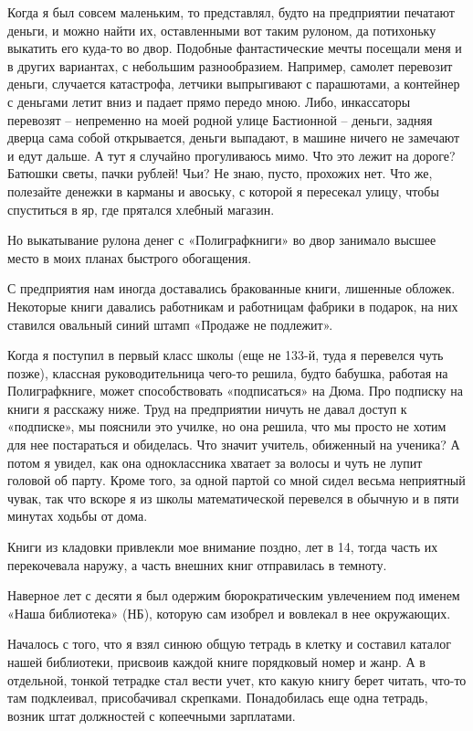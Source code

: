 Когда я был совсем маленьким, то представлял, будто на предприятии печатают деньги, и можно найти их, оставленными вот таким рулоном, да потихоньку выкатить его куда-то во двор. Подобные фантастические мечты посещали меня и в других вариантах, с небольшим разнообразием. Например, самолет перевозит деньги, случается катастрофа, летчики выпрыгивают с парашютами, а контейнер с деньгами летит вниз и падает прямо передо мною. Либо, инкассаторы перевозят – непременно на моей родной улице Бастионной – деньги, задняя дверца сама собой открывается, деньги выпадают, в машине ничего не замечают и едут дальше. А тут я случайно прогуливаюсь мимо. Что это лежит на дороге? Батюшки светы, пачки рублей! Чьи? Не знаю, пусто, прохожих нет. Что же, полезайте денежки в карманы и авоську, с которой я пересекал улицу, чтобы спуститься в яр, где прятался хлебный магазин.

Но выкатывание рулона денег с «Полиграфкниги» во двор занимало высшее место в моих планах быстрого обогащения.

С предприятия нам иногда доставались бракованные книги, лишенные обложек. Некоторые книги давались работникам и работницам фабрики в подарок, на них ставился овальный синий штамп «Продаже не подлежит».

Когда я поступил в первый класс школы (еще не 133-й, туда я перевелся чуть позже), классная руководительница чего-то решила, будто бабушка, работая на Полиграфкниге, может способствовать «подписаться» на Дюма. Про подписку на книги я расскажу ниже. Труд на предприятии ничуть не давал доступ к «подписке», мы пояснили это училке, но она решила, что мы просто не хотим для нее постараться и обиделась. Что значит учитель, обиженный на ученика? А потом я увидел, как она одноклассника хватает за волосы и чуть не лупит головой об парту. Кроме того, за одной партой со мной сидел весьма неприятный чувак, так что вскоре я из школы математической перевелся в обычную и в пяти минутах ходьбы от дома.

Книги из кладовки привлекли мое внимание поздно, лет в 14, тогда часть их перекочевала наружу, а часть внешних книг отправилась в темноту.

Наверное лет с десяти я был одержим бюрократическим увлечением под именем «Наша библиотека» (НБ), которую сам изобрел и вовлекал в нее окружающих. 

Началось с того, что я взял синюю общую тетрадь в клетку и составил каталог нашей библиотеки, присвоив каждой книге порядковый номер и жанр. А в отдельной, тонкой тетрадке стал вести учет, кто какую книгу берет читать, что-то там подклеивал, присобачивал скрепками. Понадобилась еще одна тетрадь, возник штат должностей с копеечными зарплатами. 

